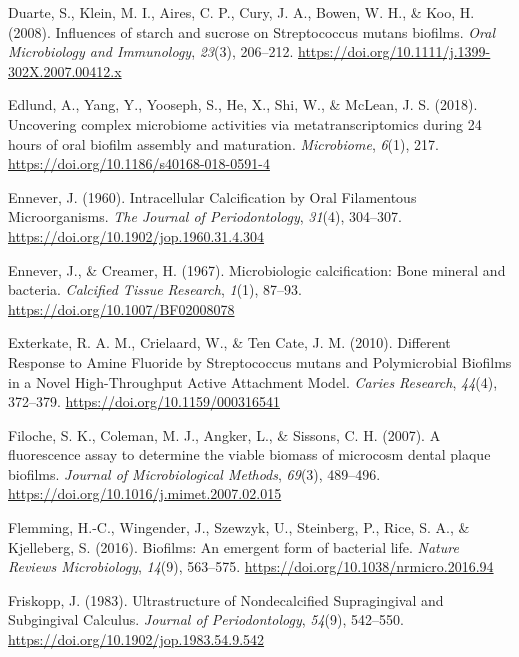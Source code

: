 \documentclass[
  b5paper,
]{book}
\newlength{\cslhangindent}
\newlength{\cslentryspacingunit} %
\newenvironment{CSLReferences}[2] %
 {%
  \setlength{\parindent}{0pt}
  \ifodd #1
  \let\oldpar\par
  \def\par{\hangindent=\cslhangindent\oldpar}
  \fi
  \setlength{\parskip}{#2\cslentryspacingunit}
 }%
 {}
\begin{document}
\begin{CSLReferences}{1}{0}
\leavevmode{}%
Duarte, S., Klein, M. I., Aires, C. P., Cury, J. A., Bowen, W. H., \&
Koo, H. (2008). Influences of starch and sucrose on {Streptococcus}
mutans biofilms. \emph{Oral Microbiology and Immunology}, \emph{23}(3),
206--212. \url{https://doi.org/10.1111/j.1399-302X.2007.00412.x}

\leavevmode{}%
Edlund, A., Yang, Y., Yooseph, S., He, X., Shi, W., \& McLean, J. S.
(2018). Uncovering complex microbiome activities via metatranscriptomics
during 24 hours of oral biofilm assembly and maturation.
\emph{Microbiome}, \emph{6}(1), 217.
\url{https://doi.org/10.1186/s40168-018-0591-4}

\leavevmode{}%
Ennever, J. (1960). Intracellular {Calcification} by {Oral Filamentous
Microorganisms}. \emph{The Journal of Periodontology}, \emph{31}(4),
304--307. \url{https://doi.org/10.1902/jop.1960.31.4.304}

\leavevmode{}%
Ennever, J., \& Creamer, H. (1967). Microbiologic calcification: {Bone}
mineral and bacteria. \emph{Calcified Tissue Research}, \emph{1}(1),
87--93. \url{https://doi.org/10.1007/BF02008078}

\leavevmode{}%
Exterkate, R. A. M., Crielaard, W., \& Ten Cate, J. M. (2010). Different
{Response} to {Amine Fluoride} by {Streptococcus} mutans and
{Polymicrobial Biofilms} in a {Novel High-Throughput Active Attachment
Model}. \emph{Caries Research}, \emph{44}(4), 372--379.
\url{https://doi.org/10.1159/000316541}

\leavevmode{}%
Filoche, S. K., Coleman, M. J., Angker, L., \& Sissons, C. H. (2007). A
fluorescence assay to determine the viable biomass of microcosm dental
plaque biofilms. \emph{Journal of Microbiological Methods},
\emph{69}(3), 489--496.
\url{https://doi.org/10.1016/j.mimet.2007.02.015}

\leavevmode{}%
Flemming, H.-C., Wingender, J., Szewzyk, U., Steinberg, P., Rice, S. A.,
\& Kjelleberg, S. (2016). Biofilms: An emergent form of bacterial life.
\emph{Nature Reviews Microbiology}, \emph{14}(9), 563--575.
\url{https://doi.org/10.1038/nrmicro.2016.94}

\leavevmode{}%
Friskopp, J. (1983). Ultrastructure of {Nondecalcified Supragingival}
and {Subgingival Calculus}. \emph{Journal of Periodontology},
\emph{54}(9), 542--550. \url{https://doi.org/10.1902/jop.1983.54.9.542}


\end{CSLReferences}
\end{document}
